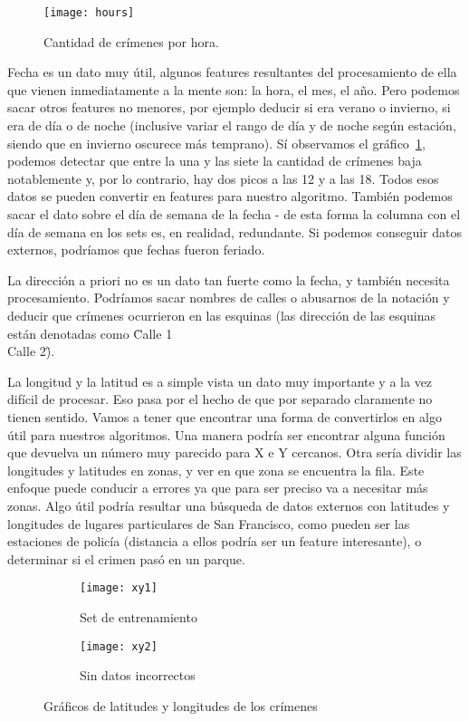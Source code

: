 \begin{figure}[H]
\texttt{[image: hours]}
\caption{Cantidad de crímenes por hora.}
\label{fig:hours}
\end{figure}

Fecha es un dato muy útil, algunos features resultantes del procesamiento de ella que vienen inmediatamente a la mente son: la hora, el mes, el año. Pero podemos sacar otros features no menores, por ejemplo deducir si era verano o invierno, si era de día o de noche (inclusive variar el rango de día y de noche según estación, siendo que en invierno oscurece más temprano). Sí observamos el gráfico~\ref{fig:hours}, podemos detectar que entre la una y las siete la cantidad de crímenes baja notablemente y, por lo contrario, hay dos picos a las 12 y a las 18. Todos esos datos se pueden convertir en features para nuestro algoritmo. También podemos sacar el dato sobre el día de semana de la fecha - de esta forma la columna con el día de semana en los sets es, en realidad, redundante. Si podemos conseguir datos externos, podríamos que fechas fueron feriado.

La dirección a priori no es un dato tan fuerte como la fecha, y también necesita procesamiento. Podríamos sacar nombres de calles o abusarnos de la notación y deducir que crímenes ocurrieron en las esquinas (las dirección de las esquinas están denotadas como \"Calle 1 \\ Calle 2\").

La longitud y la latitud es a simple vista un dato muy importante y a la vez difícil de procesar. Eso pasa por el hecho de que por separado claramente no tienen sentido. Vamos a tener que encontrar una forma de convertirlos en algo útil para nuestros algoritmos. Una manera podría ser encontrar alguna función que devuelva un número muy parecido para X e Y cercanos. Otra sería dividir las longitudes y latitudes en zonas, y ver en que zona se encuentra la fila. Este enfoque puede conducir a errores ya que para ser preciso va a necesitar más zonas. Algo útil podría resultar una búsqueda de datos externos con latitudes y longitudes de lugares particulares de San Francisco, como pueden ser las estaciones de policía (distancia a ellos podría ser un feature interesante), o determinar si el crimen pasó en un parque.

\begin{figure}[H]
\centering
\begin{subfigure}{.5\textwidth}
  \centering
  \texttt{[image: xy1]}
  \caption{Set de entrenamiento}
  \label{fig:xy1}
\end{subfigure}%
\begin{subfigure}{.5\textwidth}
  \centering
  \texttt{[image: xy2]}
  \caption{Sin datos incorrectos}
  \label{fig:xy2}
\end{subfigure}
\caption{Gráficos de latitudes y longitudes de los crímenes}
\label{fig:xy}
\end{figure}


